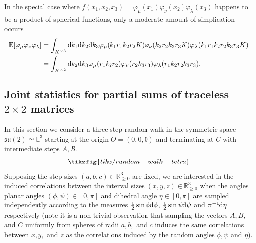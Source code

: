 \documentclass[notitlepage]{article}
\begin{document}
In the special case where $f(x_1, x_2, x_3) = \varphi_{\mu}(x_1)\varphi_{\nu}(x_2)\varphi_{\lambda}(x_3)$ happens to be a product of spherical functions, only a moderate amount of simplication occurs
\begin{align}
    \mathbb E[\varphi_{\mu}\varphi_{\nu}\varphi_{\lambda}] 
    &= \int_{K^{\times 3}} \mathrm{d} k_1 \mathrm{d} k_2 \mathrm{d} k_3 \varphi_{\mu}(k_1r_1k_2r_2K)\varphi_{\nu}(k_2r_2k_3r_3K)\varphi_{\lambda}(k_1r_1k_2r_2k_3r_3K) \\
    &= \int_{K^{\times 2}}\mathrm{d} k_2 \mathrm{d} k_3 \varphi_{\mu}(r_1k_2r_2)\varphi_{\nu}(r_2k_3r_3)\varphi_{\lambda}(r_1k_2r_2k_3r_3).
\end{align}

\subsection{Joint statistics for partial sums of traceless \texorpdfstring{$2\times 2$}{2 by 2} matrices}

In this section we consider a three-step random walk in the symmetric space $\mathfrak{su}(2) \simeq \mathbb E^{3}$ starting at the origin $O = (0,0,0)$ and terminating at $C$ with intermediate steps $A,B$.
\begin{equation}
    \tikzfig{tikz/random-walk-tetra}
\end{equation}
Supposing the step sizes $(a,b,c) \in \mathbb R_{\geq 0}^{3}$ are fixed, we are interested in the induced correlations between the interval sizes $(x,y,z) \in \mathbb R_{\geq 0}^{3}$ when the angles planar angles $(\phi, \psi) \in [0,\pi]$ and dihedral angle $\eta \in [0,\pi]$ are sampled independently according to the measures $\frac{1}{2}\sin \phi \mathrm{d} \phi$, $\frac{1}{2}\sin \psi \mathrm{d} \psi$ and $\pi^{-1}\mathrm{d} \eta$ respectively (note it is a non-trivial observation that sampling the vectors $A, B,$ and $C$ uniformly from spheres of radii $a,b,$ and $c$ induces the same correlations between $x,y,$ and $z$ as the correlations induced by the random angles $\phi, \psi$ and $\eta$).
\end{document}

